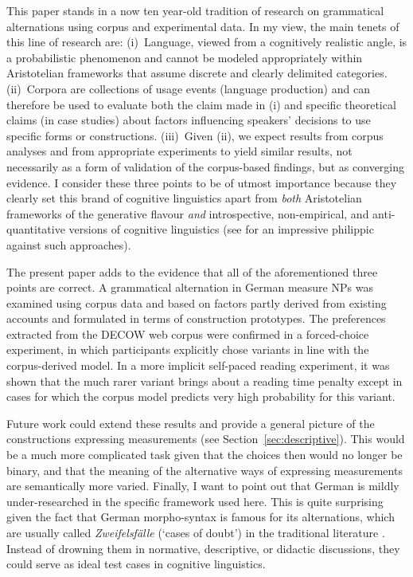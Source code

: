 \documentclass[USenglish]{article}
\begin{document}
This paper stands in a now ten year-old tradition of research on grammatical alternations using corpus and experimental data.
In my view, the main tenets of this line of research are:
(i)~Language, viewed from a cognitively realistic angle, is a probabilistic phenomenon and cannot be modeled appropriately within Aristotelian frameworks that assume discrete and clearly delimited categories.
(ii)~Corpora are collections of usage events (language production) and can therefore be used to evaluate both the claim made in (i) and specific theoretical claims (in case studies) about factors influencing speakers' decisions to use specific forms or constructions.
(iii)~Given (ii), we expect results from corpus analyses and from appropriate experiments to yield similar results, not necessarily as a form of validation of the corpus-based findings, but as converging evidence.
I consider these three points to be of utmost importance because they clearly set this brand of cognitive linguistics apart from \textit{both} Aristotelian frameworks of the generative flavour \textit{and} introspective, non-empirical, and anti-quantitative versions of cognitive linguistics (see \citealp{Dabrowska2016} for an impressive philippic against such approaches).

The present paper adds to the evidence that all of the aforementioned three points are correct.
A grammatical alternation in German measure NPs was examined using corpus data and based on factors partly derived from existing accounts and formulated in terms of construction prototypes.
The preferences extracted from the DECOW web corpus were confirmed in a forced-choice experiment, in which participants explicitly chose variants in line with the corpus-derived model.
In a more implicit self-paced reading experiment, it was shown that the much rarer variant brings about a reading time penalty except in cases for which the corpus model predicts very high probability for this variant.

Future work could extend these results and provide a general picture of the constructions expressing measurements (see Section~\ref{sec:descriptive}).
This would be a much more complicated task given that the choices then would no longer be binary, and that the meaning of the alternative ways of expressing measurements are semantically more varied.
Finally, I want to point out that German is mildly under-researched in the specific framework used here.
This is quite surprising given the fact that German morpho-syntax is famous for its alternations, which are usually called \textit{Zweifelsfälle} (`cases of doubt') in the traditional literature \citep{Klein2009}.
Instead of drowning them in normative, descriptive, or didactic discussions, they could serve as ideal test cases in cognitive linguistics.
\end{document}
